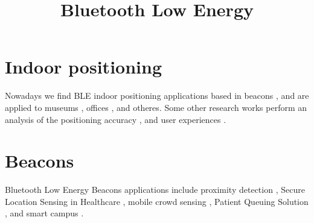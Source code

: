 \documentclass[10pt,a4paper]{article}
\title{Bluetooth Low Energy}
\begin{document}
\maketitle

\section{Indoor positioning}

Nowadays we find BLE indoor positioning applications based in beacons \cite{WOS:000363238300013, WOS:000371717205060}, and are applied to museums \cite{WOS:000380412500076}, offices \cite{WOS:000449004400022}, and otheres. Some other research works perform an analysis of the positioning accuracy \cite{WOS:000380396600019, WOS:000426343700039, WOS:000403647100020}, and user experiences \cite{WOS:000390296600023}.

\section{Beacons}

Bluetooth Low Energy Beacons applications include proximity detection \cite{WOS:000376613200033}, Secure Location Sensing in Healthcare \cite{WOS:000433385100006}, mobile crowd sensing \cite{WOS:000426978700312}, Patient Queuing Solution \cite{WOS:000458534800043}, and smart campus \cite{WOS:000403973600278}.




\end{document}
